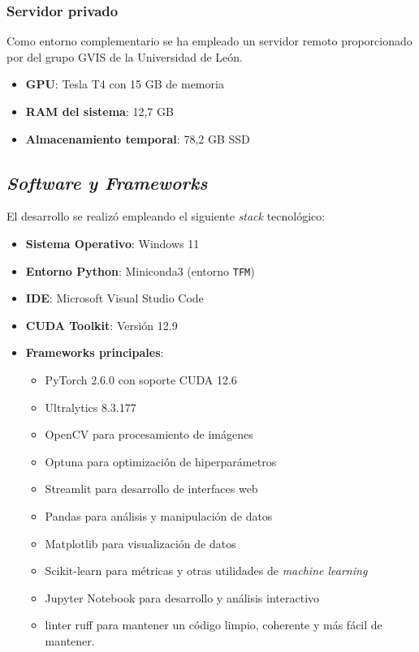 \documentclass[12pt,a4paper,onecolumn,oneside]{report}
\begin{document}
\subsubsection{Servidor privado}
Como entorno complementario se ha empleado un servidor remoto proporcionado por del grupo GVIS de la Universidad de León.

\begin{itemize}
    \item \textbf{GPU}: Tesla T4 con 15 GB de memoria
    \item \textbf{RAM del sistema}: 12,7 GB
    \item \textbf{Almacenamiento temporal}: 78,2 GB SSD
\end{itemize}

\subsection{\textit{Software y Frameworks}}

El desarrollo se realizó empleando el siguiente \textit{stack} tecnológico:

\begin{itemize}
    \item \textbf{Sistema Operativo}: Windows 11
    \item \textbf{Entorno Python}: Miniconda3 (entorno \texttt{TFM})
    \item \textbf{IDE}: Microsoft Visual Studio Code
    \item \textbf{CUDA Toolkit}: Versión 12.9
    \item \textbf{Frameworks principales}:
    \begin{itemize}
        \item PyTorch 2.6.0 con soporte CUDA 12.6
        \item Ultralytics 8.3.177
        \item OpenCV para procesamiento de imágenes
        \item Optuna para optimización de hiperparámetros 
        \item Streamlit para desarrollo de interfaces web
        \item Pandas para análisis y manipulación de datos
        \item Matplotlib para visualización de datos 
        \item Scikit-learn para métricas y otras utilidades de \textit{machine learning}
        \item Jupyter Notebook para desarrollo y análisis interactivo
        \item linter ruff para mantener un código limpio, coherente y más fácil de mantener.
    \end{itemize}
\end{itemize}
\end{document}
